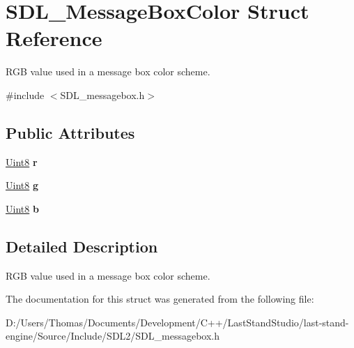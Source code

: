 \hypertarget{structSDL__MessageBoxColor}{}\section{S\+D\+L\+\_\+\+Message\+Box\+Color Struct Reference}
\label{structSDL__MessageBoxColor}


R\+G\+B value used in a message box color scheme.  




{\ttfamily \#include $<$S\+D\+L\+\_\+messagebox.\+h$>$}

\subsection*{Public Attributes}
\begin{DoxyCompactItemize}
\item 
\hypertarget{structSDL__MessageBoxColor_a43ab2172c10058380fcf67ecc3f53184}{}\hyperlink{SDL__stdinc_8h_a2944638813a090aa23e62f4da842c3e2}{Uint8} {\bfseries r}\label{structSDL__MessageBoxColor_a43ab2172c10058380fcf67ecc3f53184}

\item 
\hypertarget{structSDL__MessageBoxColor_a5820adab0b32aa3eade101ea36ed6b4a}{}\hyperlink{SDL__stdinc_8h_a2944638813a090aa23e62f4da842c3e2}{Uint8} {\bfseries g}\label{structSDL__MessageBoxColor_a5820adab0b32aa3eade101ea36ed6b4a}

\item 
\hypertarget{structSDL__MessageBoxColor_ad1215a42167cb5b190ff8f19dbd42066}{}\hyperlink{SDL__stdinc_8h_a2944638813a090aa23e62f4da842c3e2}{Uint8} {\bfseries b}\label{structSDL__MessageBoxColor_ad1215a42167cb5b190ff8f19dbd42066}

\end{DoxyCompactItemize}


\subsection{Detailed Description}
R\+G\+B value used in a message box color scheme. 

The documentation for this struct was generated from the following file\+:\begin{DoxyCompactItemize}
\item 
D\+:/\+Users/\+Thomas/\+Documents/\+Development/\+C++/\+Last\+Stand\+Studio/last-\/stand-\/engine/\+Source/\+Include/\+S\+D\+L2/S\+D\+L\+\_\+messagebox.\+h\end{DoxyCompactItemize}
